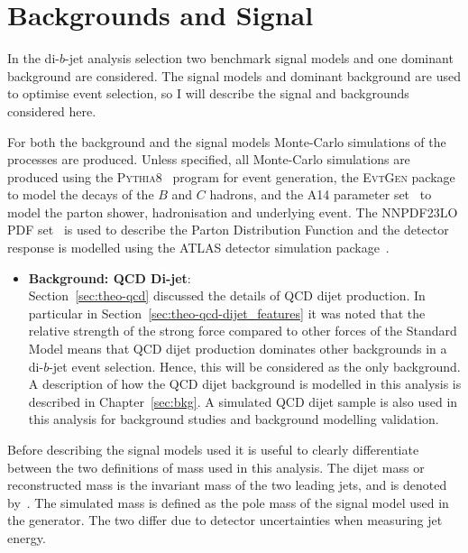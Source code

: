 \section{Backgrounds and Signal}
\label{sec:evt-s+b}

In the di-$b$-jet analysis selection two
benchmark signal models and one dominant background are considered.
The signal models and dominant background are
used to optimise event selection, so I will describe
the signal and backgrounds considered here.

For both the background and the signal models Monte-Carlo simulations of the processes are produced.
Unless specified, all Monte-Carlo simulations are produced using
the \textsc{Pythia8}~\cite{dibjet-pythia8} program for event generation,
the \textsc{EvtGen} package~\cite{trig-evtGen} to model the decays of the $B$ and $C$ hadrons,
and the A14 parameter set~\cite{dibjet-a14} to model the parton shower, hadronisation and underlying event.
The NNPDF23LO PDF set~\cite{dibjet-nnpdf} is used to describe the Parton Distribution Function and
the detector response is modelled using the ATLAS detector simulation package~\cite{dijet-sim_ATLAS}.

\begin{itemize}[leftmargin=*]
\item\textbf{Background: QCD Di-jet}:  \vspace{1em} \\
  Section~\ref{sec:theo-qcd} discussed the details of QCD dijet production.
  In particular in Section~\ref{sec:theo-qcd-dijet_features} it was noted that the
  relative strength of the strong force compared to other forces
  of the Standard Model means that
  QCD dijet production dominates other backgrounds in a di-$b$-jet event selection.
  Hence, this will be considered as the only background.
  A description of how the QCD dijet background is modelled in this analysis is described in Chapter~\ref{sec:bkg}.
  A simulated QCD dijet sample is also used in this analysis
  for background studies and background modelling validation.
  \end{itemize}

\noindent
Before describing the signal models used it is useful to clearly differentiate between the two definitions of mass used in this analysis.
The dijet mass or reconstructed mass is the invariant mass of the two leading jets, and is denoted by~\mjj.
The simulated mass is defined as the pole mass of the signal model used in the generator.
The two differ due to detector uncertainties when measuring jet energy.

